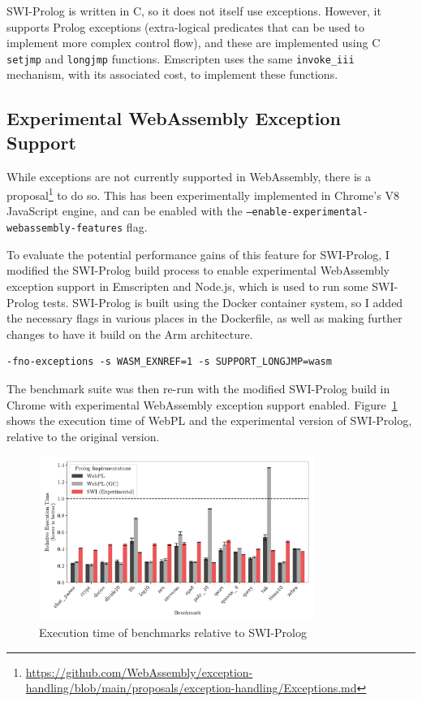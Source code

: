 SWI-Prolog is written in C, so it does not itself use exceptions. However, it supports Prolog exceptions (extra-logical predicates that can be used to implement more complex control flow), and these are implemented using C \texttt{setjmp} and \texttt{longjmp} functions. Emscripten uses the same \texttt{invoke\_iii} mechanism, with its associated cost, to implement these functions.

\subsection{Experimental WebAssembly Exception Support}

While exceptions are not currently supported in WebAssembly, there is a proposal\footnote{\url{https://github.com/WebAssembly/exception-handling/blob/main/proposals/exception-handling/Exceptions.md}} to do so. This has been experimentally implemented in Chrome's V8 JavaScript engine, and can be enabled with the \texttt{--enable-experimental-webassembly-features} flag.

To evaluate the potential performance gains of this feature for SWI-Prolog, I modified the SWI-Prolog build process to enable experimental WebAssembly exception support in Emscripten and Node.js, which is used to run some SWI-Prolog tests. SWI-Prolog is built using the Docker container system, so I added the necessary flags in various places in the Dockerfile, as well as making further changes to have it build on the Arm architecture.

\vspace*{-1em}

\begin{verbatim}
-fno-exceptions -s WASM_EXNREF=1 -s SUPPORT_LONGJMP=wasm
\end{verbatim}

\vspace*{-1em}

The benchmark suite was then re-run with the modified SWI-Prolog build in Chrome with experimental WebAssembly exception support enabled. Figure~\ref{fig:swi-prolog-exception} shows the execution time of WebPL and the experimental version of SWI-Prolog, relative to the original version.

\begin{figure}[H]
\centering
\includegraphics[width=0.8\textwidth]{relative_performance_exnref.pdf}
\caption{Execution time of benchmarks relative to SWI-Prolog}
\label{fig:swi-prolog-exception}
\end{figure}

